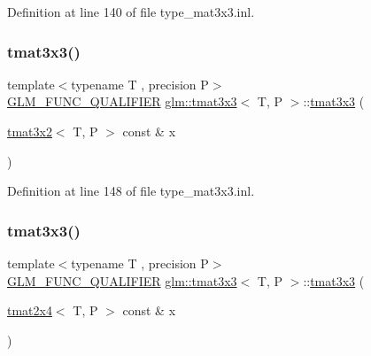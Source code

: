 Definition at line 140 of file type\+\_\+mat3x3.\+inl.

\mbox{\label{structglm_1_1tmat3x3_a69d122cdc832030b626f7a34524216b0}} 
\subsubsection{\texorpdfstring{tmat3x3()}{tmat3x3()}\hspace{0.1cm}{\footnotesize\ttfamily [14/22]}}
{\footnotesize\ttfamily template$<$typename T , precision P$>$ \\
\mbox{\hyperlink{setup_8hpp_a33fdea6f91c5f834105f7415e2a64407}{G\+L\+M\+\_\+\+F\+U\+N\+C\+\_\+\+Q\+U\+A\+L\+I\+F\+I\+ER}} \mbox{\hyperlink{structglm_1_1tmat3x3}{glm\+::tmat3x3}}$<$ T, P $>$\+::\mbox{\hyperlink{structglm_1_1tmat3x3}{tmat3x3}} (\begin{DoxyParamCaption}\item[{\mbox{\hyperlink{structglm_1_1tmat3x2}{tmat3x2}}$<$ T, P $>$ const \&}]{x }\end{DoxyParamCaption})}



Definition at line 148 of file type\+\_\+mat3x3.\+inl.

\mbox{\label{structglm_1_1tmat3x3_a945eb750045d533d8d9a56eb76011cfe}} 
\subsubsection{\texorpdfstring{tmat3x3()}{tmat3x3()}\hspace{0.1cm}{\footnotesize\ttfamily [15/22]}}
{\footnotesize\ttfamily template$<$typename T , precision P$>$ \\
\mbox{\hyperlink{setup_8hpp_a33fdea6f91c5f834105f7415e2a64407}{G\+L\+M\+\_\+\+F\+U\+N\+C\+\_\+\+Q\+U\+A\+L\+I\+F\+I\+ER}} \mbox{\hyperlink{structglm_1_1tmat3x3}{glm\+::tmat3x3}}$<$ T, P $>$\+::\mbox{\hyperlink{structglm_1_1tmat3x3}{tmat3x3}} (\begin{DoxyParamCaption}\item[{\mbox{\hyperlink{structglm_1_1tmat2x4}{tmat2x4}}$<$ T, P $>$ const \&}]{x }\end{DoxyParamCaption})}



